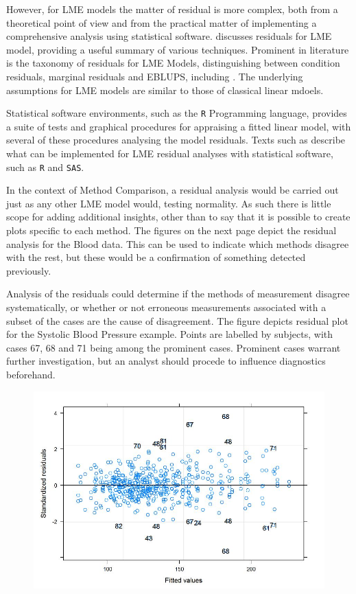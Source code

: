 \documentclass[12pt, a4paper]{report}
\theoremstyle{plain}
\theoremstyle{definition}
\theoremstyle{remark}
\begin{document}
	
	
	However, for LME models the matter of residual is more complex, both from a theoretical point of view and from the practical matter of implementing a comprehensive analysis using statistical software. \citet{schabenberger} discusses residuals for LME model, providing a useful summary of various techniques. Prominent in literature is the taxonomy of residuals for LME Models, distinguishing between condition residuals, marginal residuals and EBLUPS, including \citet{ HildenMinton, schabenberger, west, NobreSinger2007}. The underlying assumptions for LME models are similar to those of classical linear mdoels. 
	
	Statistical software environments, such as the \texttt{R} Programming language, provides a suite of tests and graphical procedures for appraising a fitted linear model, with several of these procedures analysing the model residuals. Texts such as \citet{PB,west,Galecki} describe what can be implemented for LME residual analyses with statistical software, such as \texttt{R} and \texttt{SAS}.
	
	
	In the context of Method Comparison, a residual analysis would be carried out just as any other LME model would, testing normality. As such there is little scope for adding additional insights, other than to say that
	it is possible to create plots specific to each method. The figures on the next page depict the residual analysis for the Blood data. This can be used to indicate which methods disagree with the rest, but these would be a confirmation of something detected previously.
	
	Analysis of the residuals could determine if the methods of measurement disagree systematically, or whether or not erroneous measurements associated with a subset of the cases are the cause of disagreement. 
	The figure depicts residual plot for the Systolic Blood Pressure example. Points are labelled by subjects, with cases 67, 68 and 71 being among the prominent cases. Prominent cases warrant further investigation, but an analyst should procede to influence diagnostics beforehand.
	
	\begin{figure}[h!]
		\centering
		\includegraphics[width=0.8\linewidth]{images/Residuals-JS-Roy}
	\end{figure}
	
\end{document}
